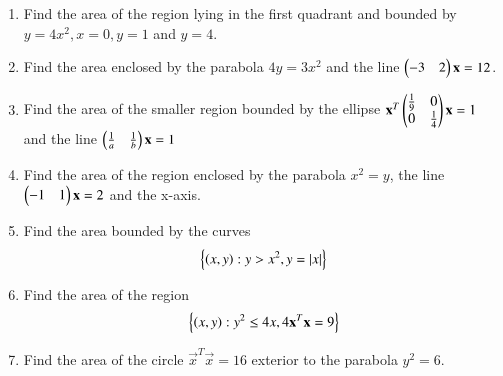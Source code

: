 \begin{enumerate}[label=\thesection.\arabic*.,ref=\thesection.\theenumi]
\item Find the area of the region lying in the first quadrant and bounded by $y = 4x^2, x = 0, y = 1$ and $y = 4$.
\item Find the area enclosed by the parabola $4y = 3x^2$ and the line $\begin{pmatrix}-3 & 2\end{pmatrix}\mathbf{x} = 12$.
%
\item Find the area of the smaller region bounded by the ellipse
$
\mathbf{x}^T\begin{pmatrix}\frac{1}{9} & 0 \\ 0 & \frac{1}{4}\end{pmatrix}\mathbf{x} = 1
$
and the line 
$
\begin{pmatrix}\frac{1}{a} & \frac{1}{b}\end{pmatrix}\mathbf{x} = 1
$
\item Find the area of the region enclosed by the parabola $x^2=y$, the line $\begin{pmatrix}-1 & 1\end{pmatrix}\mathbf{x} = 2$ and the x-axis.
%
\item Find the area bounded by the curves
\begin{align}
\left\{\left(x,y\right) : y > x^2, y = \left\vert x\right\vert\right\}
\end{align}
%
\item Find the area of the region
\begin{align}
\left\{\left(x,y\right) : y^2 \le 4x, 4\mathbf{x}^T\mathbf{x} = 9\right\}
\end{align}
%
\item Find the area of the circle $\vec{x}^T\vec{x} = 16$ exterior to the parabola $y^2 = 6$.
\end{enumerate}

